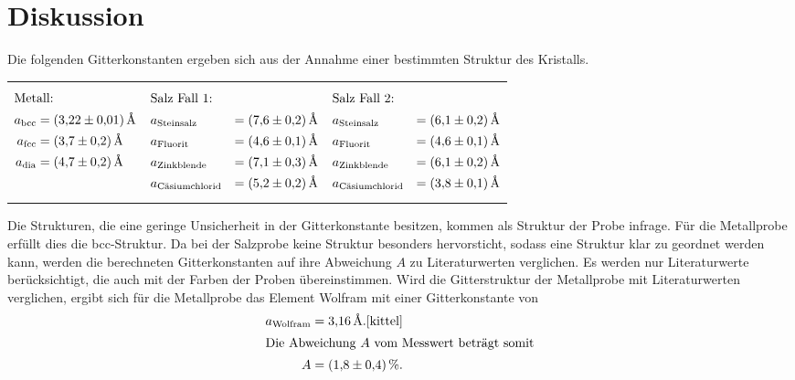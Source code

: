 \section{Diskussion}
\label{sec:Diskussion}
Die folgenden Gitterkonstanten ergeben sich aus der Annahme einer
bestimmten Struktur des Kristalls.
\begin{table}
  \centering
\begin{tabular}{p{} p{} p{} }
{\begin{align*}
\intertext{Metall:}
a_\mathrm{bcc}&=\SI{3.22(1)}{\angstrom}\\
a_\mathrm{fcc}&=\SI{3.7(2)}{\angstrom}\\
a_\mathrm{dia}&=\SI{4.7(2)}{\angstrom}
\end{align*}}
&
{\begin{align*}
\intertext{Salz Fall 1:}
&a_{\text{Steinsalz}}&=\SI{7.6(2)}{\angstrom}\\
&a_{\text{Fluorit}}&=\SI{4.6(1)}{\angstrom}\\
&a_{\text{Zinkblende}}&=\SI{7.1(3)}{\angstrom}\\
&a_{\text{Cäsiumchlorid}} &=\SI{5.2(2)}{\angstrom}
\end{align*}}
&
{\begin{align*}
\intertext{Salz Fall 2:}
&a_{\text{Steinsalz}}&=\SI{6.1(2)}{\angstrom}\\
&a_{\text{Fluorit}}&=\SI{4.6(1)}{\angstrom}\\
&a_{\text{Zinkblende}}&=\SI{6.1(2)}{\angstrom}\\
&a_{\text{Cäsiumchlorid}} &=\SI{3.8(1)}{\angstrom}
\end{align*}}
\end{tabular}
\end{table}
Die Strukturen, die eine geringe Unsicherheit in der Gitterkonstante besitzen,
kommen als Struktur der Probe infrage.
Für die Metallprobe erfüllt dies die bcc-Struktur.
Da bei der Salzprobe keine Struktur besonders hervorsticht, sodass
eine Struktur klar zu geordnet werden kann, werden die berechneten
Gitterkonstanten auf ihre Abweichung $A$ zu Literaturwerten verglichen.
Es werden nur Literaturwerte berücksichtigt, die auch mit der Farben der Proben übereinstimmen.
Wird die Gitterstruktur der Metallprobe mit Literaturwerten
verglichen, ergibt sich für die Metallprobe das Element
Wolfram mit einer Gitterkonstante von
\begin{align*}
a_{\text{Wolfram}}=\SI{3.16}{\angstrom}.\text{\cite{kittel}} \\
\intertext{Die Abweichung $A$ vom Messwert beträgt somit}
A=\SI{1.8(4)}{\percent}.
\end{align*}

